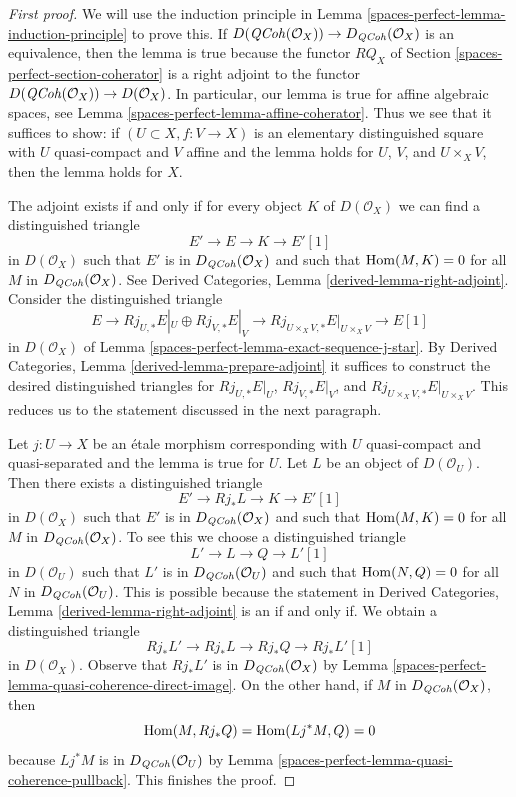 \begin{proof}[First proof]
We will use the induction principle in
Lemma \ref{spaces-perfect-lemma-induction-principle}
to prove this. If $D(\mathit{QCoh}(\mathcal{O}_X)) \to D_{\mathit{QCoh}}(\mathcal{O}_X)$
is an equivalence, then the lemma is true because the functor
$RQ_X$ of Section \ref{spaces-perfect-section-coherator} is a right adjoint to the functor
$D(\mathit{QCoh}(\mathcal{O}_X)) \to D(\mathcal{O}_X)$.
In particular, our lemma is true for affine algebraic spaces, see
Lemma \ref{spaces-perfect-lemma-affine-coherator}.
Thus we see that it suffices to show: if $(U \subset X, f : V \to X)$
is an elementary distinguished square with $U$ quasi-compact
and $V$ affine and the lemma holds for $U$, $V$, and $U \times_X V$,
then the lemma holds for $X$.

\medskip\noindent
The adjoint exists if and only if for every object $K$ of
$D(\mathcal{O}_X)$ we can find a distinguished triangle
$$
E' \to E \to K \to E'[1]
$$
in $D(\mathcal{O}_X)$
such that $E'$ is in $D_{\mathit{QCoh}}(\mathcal{O}_X)$ and such that
$\operatorname{Hom}(M, K) = 0$ for all $M$ in $D_{\mathit{QCoh}}(\mathcal{O}_X)$. See
Derived Categories, Lemma \ref{derived-lemma-right-adjoint}.
Consider the distinguished triangle
$$
E \to Rj_{U, *}E|_U \oplus Rj_{V, *}E|_V \to
Rj_{U \times_X V, *}E|_{U \times_X V} \to E[1]
$$
in $D(\mathcal{O}_X)$ of Lemma \ref{spaces-perfect-lemma-exact-sequence-j-star}.
By Derived Categories, Lemma \ref{derived-lemma-prepare-adjoint}
it suffices to construct the desired distinguished triangles
for $Rj_{U, *}E|_U$, $Rj_{V, *}E|_V$, and
$Rj_{U \times_X V, *}E|_{U \times_X V}$. This reduces us to the statement
discussed in the next paragraph.

\medskip\noindent
Let $j : U \to X$ be an \'etale morphism corresponding with
$U$ quasi-compact and quasi-separated and the lemma is true for $U$.
Let $L$ be an object of $D(\mathcal{O}_U)$.
Then there exists a distinguished triangle
$$
E' \to Rj_*L \to K \to E'[1]
$$
in $D(\mathcal{O}_X)$
such that $E'$ is in $D_{\mathit{QCoh}}(\mathcal{O}_X)$ and such that
$\operatorname{Hom}(M, K) = 0$ for all $M$ in $D_{\mathit{QCoh}}(\mathcal{O}_X)$.
To see this we choose a distinguished triangle
$$
L' \to L \to Q \to L'[1]
$$
in $D(\mathcal{O}_U)$ such that $L'$ is in $D_{\mathit{QCoh}}(\mathcal{O}_U)$
and such that $\operatorname{Hom}(N, Q) = 0$ for all $N$ in $D_{\mathit{QCoh}}(\mathcal{O}_U)$.
This is possible because the statement in
Derived Categories, Lemma \ref{derived-lemma-right-adjoint}
is an if and only if.
We obtain a distinguished triangle
$$
Rj_*L' \to Rj_*L \to Rj_*Q \to Rj_*L'[1]
$$
in $D(\mathcal{O}_X)$. Observe that $Rj_*L'$ is in $D_{\mathit{QCoh}}(\mathcal{O}_X)$
by Lemma \ref{spaces-perfect-lemma-quasi-coherence-direct-image}.
On the other hand, if $M$ in $D_{\mathit{QCoh}}(\mathcal{O}_X)$, then
$$
\operatorname{Hom}(M, Rj_*Q) = \operatorname{Hom}(Lj^*M, Q) = 0
$$
because $Lj^*M$ is in $D_{\mathit{QCoh}}(\mathcal{O}_U)$ by
Lemma \ref{spaces-perfect-lemma-quasi-coherence-pullback}.
This finishes the proof.
\end{proof}

